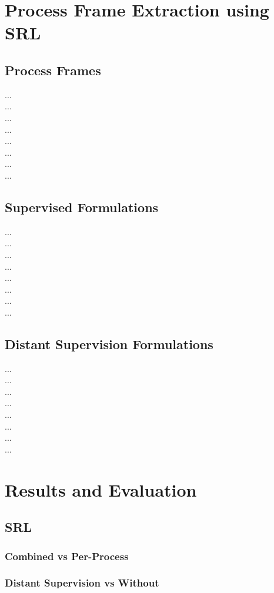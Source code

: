 \documentclass[11pt,a4paper]{article}
\begin{document}
\section{Process Frame Extraction using SRL}
	\subsection{Process Frames}
	...\\
	...\\
	...\\
	...\\
	...\\
	...\\	
	...\\
	...\\
	\subsection{Supervised Formulations}
	...\\
	...\\
	...\\
	...\\
	...\\
	...\\	
	...\\
	...\\
	
	\subsection{Distant Supervision Formulations}
	...\\
	...\\
	...\\
	...\\
	...\\
	...\\	
	...\\
	...\\
	
\newpage
\section{Results and Evaluation}
	\subsection{SRL}
		\subsubsection{Combined vs Per-Process}
		\subsubsection{Distant Supervision vs Without}
\end{document}
